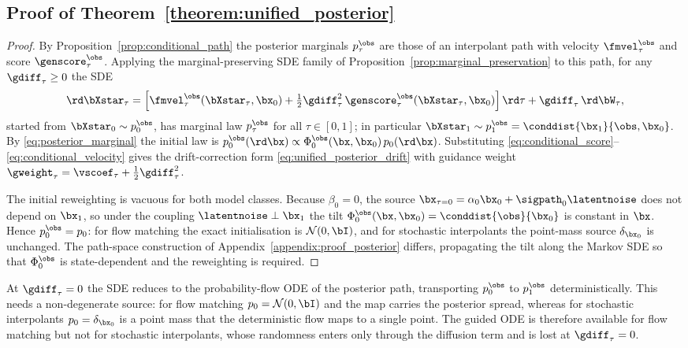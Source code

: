 \subsection{Proof of Theorem~\ref{theorem:unified_posterior}}
\begin{proof}
By Proposition~\ref{prop:conditional_path} the posterior marginals $p_\tau^{\obs}$ are those of an interpolant path with velocity $\fmvel_\tau^{\obs}$ and score $\genscore_\tau^{\obs}$. Applying the marginal-preserving SDE family of Proposition~\ref{prop:marginal_preservation} to this path, for any $\gdiff_\tau\ge0$ the SDE
\begin{align}
    \rd\bXstar_\tau = \left[\fmvel_\tau^{\obs}(\bXstar_\tau,\bx_0) + \tfrac12\gdiff_\tau^2\,\genscore_\tau^{\obs}(\bXstar_\tau,\bx_0)\right]\rd\tau + \gdiff_\tau\,\rd\bW_\tau,
\end{align}
started from $\bXstar_0\sim p_0^{\obs}$, has marginal law $p_\tau^{\obs}$ for all $\tau\in[0,1]$; in particular $\bXstar_1\sim p_1^{\obs}=\conddist{\bx_1}{\obs,\bx_0}$. By \eqref{eq:posterior_marginal} the initial law is $p_0^{\obs}(\rd\bx)\propto\Phi_0^{\obs}(\bx,\bx_0)\,p_0(\rd\bx)$. Substituting \eqref{eq:conditional_score}--\eqref{eq:conditional_velocity} gives the drift-correction form \eqref{eq:unified_posterior_drift} with guidance weight $\gweight_\tau=\vscoef_\tau+\tfrac12\gdiff_\tau^2$.

The initial reweighting is vacuous for both model classes. Because $\beta_0=0$, the source $\bx_{\tau=0}=\alpha_0\bx_0+\sigpath_0\latentnoise$ does not depend on $\bx_1$, so under the coupling $\latentnoise\perp\bx_1$ the tilt $\Phi_0^{\obs}(\bx,\bx_0)=\conddist{\obs}{\bx_0}$ is constant in $\bx$. Hence $p_0^{\obs}=p_0$: for flow matching the exact initialisation is $\mathcal{N}(0,\bI)$, and for stochastic interpolants the point-mass source $\delta_{\bx_0}$ is unchanged. The path-space construction of Appendix~\ref{appendix:proof_posterior} differs, propagating the tilt along the Markov SDE so that $\Phi_0^{\obs}$ is state-dependent and the reweighting is required.
\end{proof}

\begin{remark}
At $\gdiff_\tau=0$ the SDE reduces to the probability-flow ODE of the posterior path, transporting $p_0^{\obs}$ to $p_1^{\obs}$ deterministically. This needs a non-degenerate source: for flow matching $p_0=\mathcal{N}(0,\bI)$ and the map carries the posterior spread, whereas for stochastic interpolants $p_0=\delta_{\bx_0}$ is a point mass that the deterministic flow maps to a single point. The guided ODE is therefore available for flow matching but not for stochastic interpolants, whose randomness enters only through the diffusion term and is lost at $\gdiff_\tau=0$.
\end{remark}










